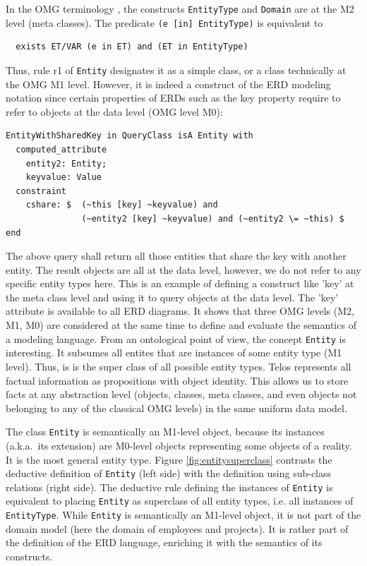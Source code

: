 In the OMG terminology \cite{OMG2011}, the constructs {\tt EntityType} and {\tt Domain} are at the M2 level
(meta classes). The predicate {\tt (e [in] EntityType)} is equivalent to

{\small
\begin{verbatim}
  exists ET/VAR (e in ET) and (ET in EntityType)
\end{verbatim}
}

Thus, rule r1 of {\tt Entity} designates it as a simple class,
or a class technically at the OMG M1 level. However, it is indeed a construct of the ERD modeling
notation since certain properties of ERDs such as the key property require to refer to objects at
the data level (OMG level M0):


{\small
\begin{verbatim}
EntityWithSharedKey in QueryClass isA Entity with
  computed_attribute
    entity2: Entity;
    keyvalue: Value
  constraint
    cshare: $  (~this [key] ~keyvalue) and 
               (~entity2 [key] ~keyvalue) and (~entity2 \= ~this) $
end
\end{verbatim}
}

The above query shall return all those entities that share the key with another entity.
The result objects are all at the data level, however, we do not refer to any specific
entity types here. This is an example of defining a construct like 'key' at the
meta class level and using it to query objects at the data level. The 'key' attribute
is available to all ERD diagrams. It shows that three OMG levels (M2, M1, M0) are
considered at the same time to define and evaluate the semantics of a modeling language.
From an ontological point of view, the concept {\tt Entity} is interesting. It subsumes
all entites that are instances of some entity type (M1 level). Thus, is is the
super class of all possible entity types. 
Telos represents all factual information as propositions with object identity. This 
allows us to store facts at any abstraction level (objects, classes,
meta classes, and even objects not belonging to any of the classical
OMG levels) in the same uniform data model.

The class {\tt Entity} is semantically an M1-level object, because its instances
(a.k.a.\ its extension) are M0-level objects representing some objects of a reality. 
It is the most general entity type. Figure \ref{fig:entitysuperclass} contrasts the
deductive definition of {\tt Entity} (left side) with the definition using sub-class
relations (right side). The deductive rule defining the instances of {\tt Entity} is
equivalent to placing {\tt Entity} as superclass of all entity types, i.e. all instances
of {\tt EntityType}. While {\tt Entity} is semantically an M1-level object, it is not
part of the domain model (here the domain of employees and projects). It is rather part of the definition
of the ERD language, enriching it with the semantics of its constructs. 


